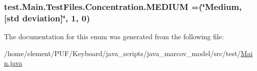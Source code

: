 \subsubsection[{\texorpdfstring{M\+E\+D\+I\+UM}{MEDIUM}}]{\setlength{\rightskip}{0pt plus 5cm}test.\+Main.\+Test\+Files.\+Concentration.\+M\+E\+D\+I\+UM =(\char`\"{}Medium, \mbox{[}std deviation\mbox{]}\char`\"{}, 1, 0)}\hypertarget{enumtest_1_1_main_1_1_test_files_1_1_concentration_aa63ada2a9617b0ac561c5ca3d0e31069}{}\label{enumtest_1_1_main_1_1_test_files_1_1_concentration_aa63ada2a9617b0ac561c5ca3d0e31069}


The documentation for this enum was generated from the following file\+:\begin{DoxyCompactItemize}
\item 
/home/element/\+P\+U\+F/\+Keyboard/java\+\_\+scripts/java\+\_\+marcov\+\_\+model/src/test/\hyperlink{_main_8java}{Main.\+java}\end{DoxyCompactItemize}
